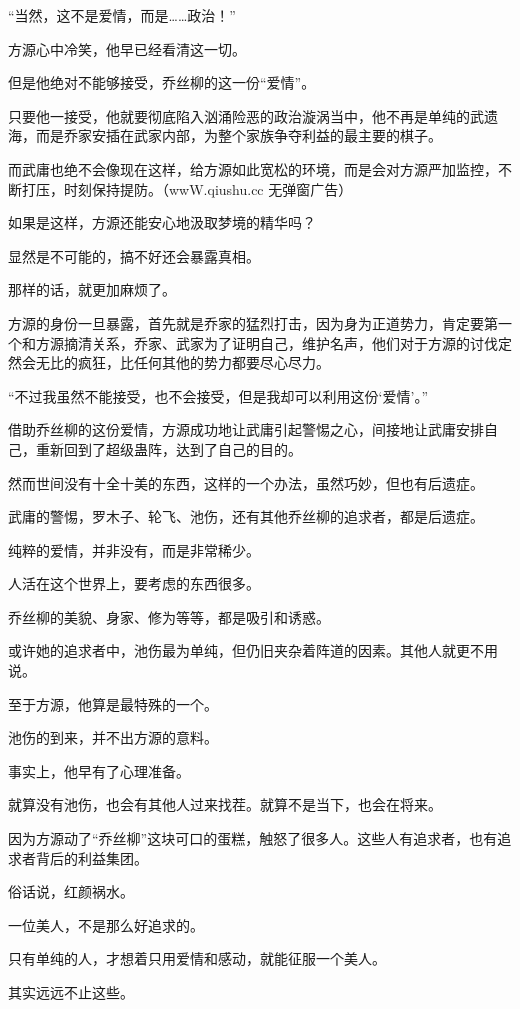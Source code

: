 \begin{this_body}
“当然，这不是爱情，而是……政治！”

方源心中冷笑，他早已经看清这一切。

但是他绝对不能够接受，乔丝柳的这一份“爱情”。

只要他一接受，他就要彻底陷入汹涌险恶的政治漩涡当中，他不再是单纯的武遗海，而是乔家安插在武家内部，为整个家族争夺利益的最主要的棋子。

而武庸也绝不会像现在这样，给方源如此宽松的环境，而是会对方源严加监控，不断打压，时刻保持提防。（wwW.qiushu.cc 无弹窗广告）

如果是这样，方源还能安心地汲取梦境的精华吗？

显然是不可能的，搞不好还会暴露真相。

那样的话，就更加麻烦了。

方源的身份一旦暴露，首先就是乔家的猛烈打击，因为身为正道势力，肯定要第一个和方源摘清关系，乔家、武家为了证明自己，维护名声，他们对于方源的讨伐定然会无比的疯狂，比任何其他的势力都要尽心尽力。

“不过我虽然不能接受，也不会接受，但是我却可以利用这份‘爱情’。”

借助乔丝柳的这份爱情，方源成功地让武庸引起警惕之心，间接地让武庸安排自己，重新回到了超级蛊阵，达到了自己的目的。

然而世间没有十全十美的东西，这样的一个办法，虽然巧妙，但也有后遗症。

武庸的警惕，罗木子、轮飞、池伤，还有其他乔丝柳的追求者，都是后遗症。

纯粹的爱情，并非没有，而是非常稀少。

人活在这个世界上，要考虑的东西很多。

乔丝柳的美貌、身家、修为等等，都是吸引和诱惑。

或许她的追求者中，池伤最为单纯，但仍旧夹杂着阵道的因素。其他人就更不用说。

至于方源，他算是最特殊的一个。

池伤的到来，并不出方源的意料。

事实上，他早有了心理准备。

就算没有池伤，也会有其他人过来找茬。就算不是当下，也会在将来。

因为方源动了“乔丝柳”这块可口的蛋糕，触怒了很多人。这些人有追求者，也有追求者背后的利益集团。

俗话说，红颜祸水。

一位美人，不是那么好追求的。

只有单纯的人，才想着只用爱情和感动，就能征服一个美人。

其实远远不止这些。


\end{this_body}

